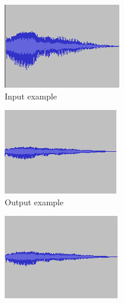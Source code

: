 \begin{figure}
\centering
\begin{subfigure}{.32\linewidth}
  \centering
  \includegraphics[width=.9\textwidth]{figs/original.png}
  \caption{Input example}
  \label{fig:inEx}
\end{subfigure}%
\begin{subfigure}{.32\linewidth}
  \centering
  \includegraphics[width=.9\textwidth]{figs/lpf800.png}
  \caption{Output example}
  \label{fig:outEx}
\end{subfigure}
\begin{subfigure}{.32\linewidth}
  \centering
  \includegraphics[width=.9\textwidth]{figs/lpf950.png}

\end{subfigure}
\end{figure}
